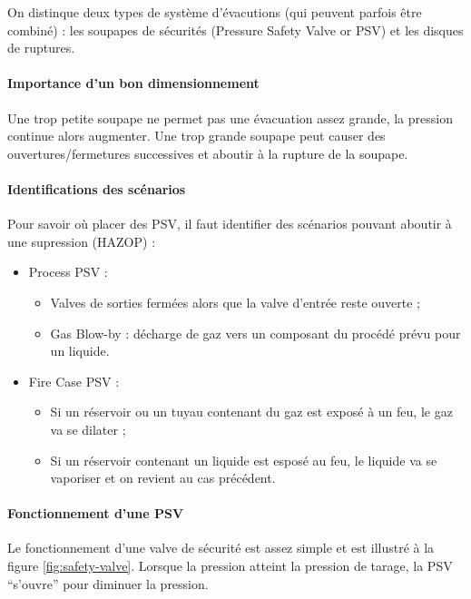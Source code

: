 On distinque deux types de système d'évacutions (qui peuvent
parfois être combiné) : les soupapes de sécurités (Pressure
Safety Valve or PSV) et les disques de ruptures.

\paragraph{Importance d'un bon dimensionnement}
Une trop petite soupape ne permet pas une évacuation
assez grande, la pression continue alors augmenter.
Une trop grande soupape peut causer des
ouvertures/fermetures successives et aboutir à la
rupture de la soupape.

\paragraph{Identifications des scénarios}
Pour savoir où placer des PSV, il faut identifier des scénarios
pouvant aboutir à une supression (HAZOP) :
\begin{itemize}
	\item Process PSV :
		\begin{itemize}
			\item Valves de sorties fermées alors que la valve
			d'entrée reste ouverte ;
			\item Gas Blow-by : décharge de gaz vers un composant
			du procédé prévu pour un liquide.
		\end{itemize}
	\item Fire Case PSV :
		\begin{itemize}
			\item	Si un réservoir ou un tuyau contenant du gaz
			est exposé à un feu, le gaz va se dilater ;
			\item Si un réservoir contenant un liquide est esposé
			au feu, le liquide va se vaporiser et on revient au
			cas précédent.
		\end{itemize}
\end{itemize}

\paragraph{Fonctionnement d'une PSV}
Le fonctionnement d'une valve de sécurité est assez
simple et est illustré à la figure \ref{fig:safety-valve}.
Lorsque la pression atteint la pression de tarage,
la PSV ``s'ouvre'' pour diminuer la pression.

